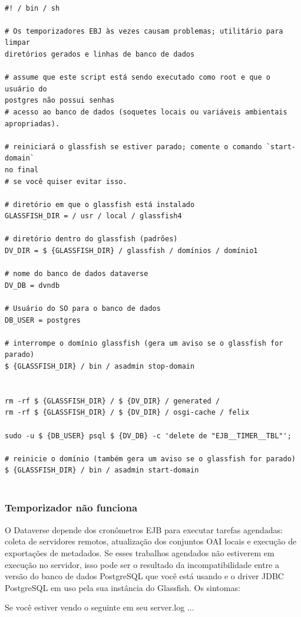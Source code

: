 \documentclass[12pt,hidelinks]{article}
\begin{document}
\begin{verbatim}

#! / bin / sh

# Os temporizadores EBJ às vezes causam problemas; utilitário para limpar
diretórios gerados e linhas de banco de dados

# assume que este script está sendo executado como root e que o usuário do
postgres não possui senhas
# acesso ao banco de dados (soquetes locais ou variáveis ambientais apropriadas).

# reiniciará o glassfish se estiver parado; comente o comando `start-domain`
no final
# se você quiser evitar isso.

# diretório em que o glassfish está instalado
GLASSFISH_DIR = / usr / local / glassfish4

# diretório dentro do glassfish (padrões)
DV_DIR = $ {GLASSFISH_DIR} / glassfish / domínios / domínio1

# nome do banco de dados dataverse
DV_DB = dvndb

# Usuário do SO para o banco de dados
DB_USER = postgres

# interrompe o domínio glassfish (gera um aviso se o glassfish for parado)
$ {GLASSFISH_DIR} / bin / asadmin stop-domain


rm -rf $ {GLASSFISH_DIR} / $ {DV_DIR} / generated /
rm -rf $ {GLASSFISH_DIR} / $ {DV_DIR} / osgi-cache / felix

sudo -u $ {DB_USER} psql $ {DV_DB} -c 'delete de "EJB__TIMER__TBL"';

# reinicie o domínio (também gera um aviso se o glassfish for parado)
$ {GLASSFISH_DIR} / bin / asadmin start-domain
 
\end{verbatim}

\subsubsection{Temporizador não funciona}

\qquad O Dataverse depende dos cronômetros EJB para executar tarefas agendadas: coleta de servidores remotos, atualização dos conjuntos OAI locais e execução de exportações de metadados. Se esses trabalhos agendados não estiverem em execução no servidor, isso pode ser o resultado da incompatibilidade entre a versão do banco de dados PostgreSQL que você está usando e o driver JDBC PostgreSQL em uso pela sua instância do Glassfish. Os sintomas:

Se você estiver vendo o seguinte em seu server.log ...\\
\end{document}
